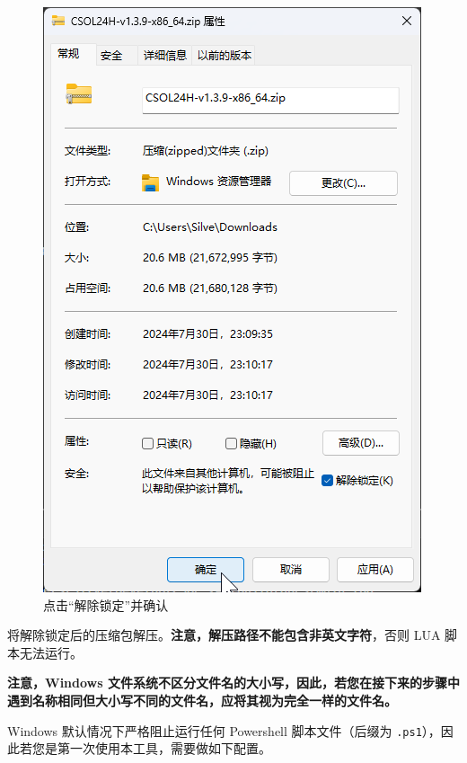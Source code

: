 \begin{figure}[H]
    \Centering
    \includegraphics[width=\textwidth]{docs/assets/unlock_01.png}
    \caption{点击“解除锁定”并确认}
\end{figure}

将解除锁定后的压缩包解压。\textbf{\color{red}注意，解压路径不能包含非英文字符}，否则 LUA 脚本无法运行。

\textbf{\color{red}注意，Windows 文件系统不区分文件名的大小写，因此，若您在接下来的步骤中遇到名称相同但大小写不同的文件名，应将其视为完全一样的文件名。}

Windows 默认情况下严格阻止运行任何 Powershell 脚本文件（后缀为 \lstinline{.ps1}），因此若您是第一次使用本工具，需要做如下配置。

